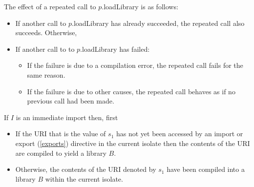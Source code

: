 \documentclass{article}
\newcommand{\code}[1]{{\sf #1}}
\begin{document}
\LMHash{}
The effect of a repeated call to \code{$p$.loadLibrary} is as follows:
\begin{itemize}
\item
If another call to \code{$p$.loadLibrary} has already succeeded, the repeated call also succeeds.
Otherwise,
\item
If another call to  to \code{$p$.loadLibrary} has failed:
\begin{itemize}
\item
If the failure is due to a compilation error, the repeated call fails for the same reason.
\item
If the failure is due to other causes, the repeated call behaves as if no previous call had been made.
\end{itemize}
\end{itemize}


\LMHash{}
If $I$ is an immediate import then, first

 \begin{itemize}
 \item
If  the URI that is the value of $s_1$ has not yet been accessed by an import or export (\ref{exports}) directive  in the current isolate then the contents of the URI  are compiled to yield a library $B$. 
\item Otherwise, the contents of the URI denoted by $s_1$ have been compiled into a library $B$ within the current isolate.
\end{itemize}
\end{document}
